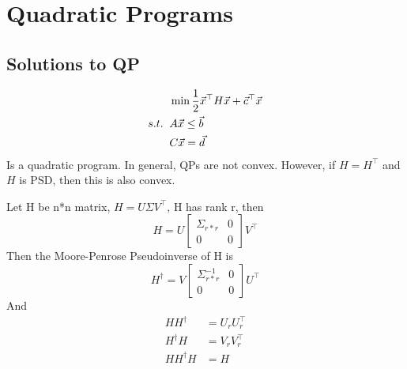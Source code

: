 \section{Quadratic Programs} %
\label{sec:quadratic_programs}

\subsection{Solutions to QP} %
\label{sub:solutions_to_qp}

\begin{definition}
	\begin{align*}
	&\min \frac{1}{2}\vec{x}^\top H\vec{x} +\vec{c}^\top\vec{x}\\
	s.t.\;\;&A\vec{x}\le\vec{b}\\
	&C\vec{x} = \vec{d}
\end{align*}
Is a quadratic program. In general, QPs are not convex. However, if $H = H^\top$ and $H$ is PSD, then this is also convex.
\end{definition}

\begin{definition}
	Let H be n*n matrix, $H = U\Sigma V^\top$, H has rank r, then
	\[
H = U \begin{bmatrix}
	\Sigma_{r*r}&0\\0&0
\end{bmatrix}V^\top
	\]
	Then the Moore-Penrose Pseudoinverse of H is
	\[
H^\dagger = V\begin{bmatrix}
	\Sigma_{r*r}^{-1}&0\\0&0
\end{bmatrix}U^\top
	\]
	And
	\begin{align*}
		HH^\dagger &= U_rU_r^\top\\
		H^\dagger H &= V_rV_r^\top\\
		HH^\dagger H &= H
	\end{align*}
\end{definition}

